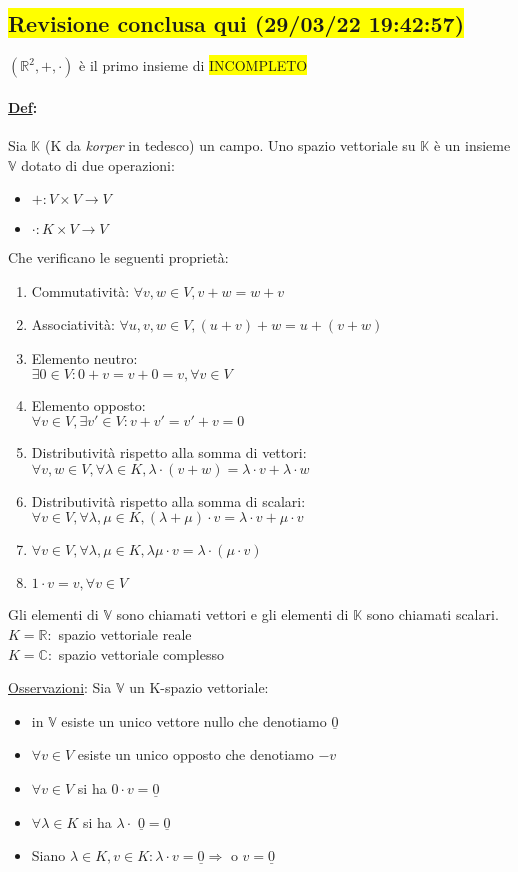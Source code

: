 \documentclass{article}
\newcommand{\hl}[1]{\colorbox{yellow}{#1}}
\newcommand{\ul}[1]{\underline{#1}}
\newcommand{\R}{\mathbb{R}}
\newcommand{\Def}[2]{\paragraph{\ul{Def}:}#1\\\hspace*{3em}\begin{minipage}{.8\textwidth}#2\end{minipage}}
\begin{document}
\subsection{\hl{Revisione conclusa qui (29/03/22 19:42:57)}}
$(\R^2,+,\cdot)$ è il primo insieme di \hl{INCOMPLETO}
\Def{Sia $\mathbb{K}$ (K da \textit{korper} in tedesco) un campo. Uno spazio vettoriale su $\mathbb{K}$ è un insieme $\mathbb{V}$ dotato di due operazioni:}{
	\begin{itemize}
		\item $+: V\times V\rightarrow V$
		\item $\cdot: K\times V\rightarrow V$
	\end{itemize}
	Che verificano le seguenti proprietà:
	\begin{enumerate}
		\item Commutatività: $\forall v,w\in V, v+w=w+v$
		\item Associatività: $\forall u,v,w\in V,(u+v)+w=u+(v+w)$
		\item Elemento neutro:\\$\exists0\in V:0+v=v+0=v,\forall v\in V$
		\item Elemento opposto:\\$\forall v\in V,\exists v'\in V:v+v'=v'+v=0$
		\item Distributività rispetto alla somma di vettori:\\$\forall v,w\in V,\forall\lambda\in K,\lambda\cdot(v+w)=\lambda\cdot v+\lambda\cdot w$
		\item Distributività rispetto alla somma di scalari:\\$\forall v\in V,\forall\lambda,\mu\in K,(\lambda+\mu)\cdot v=\lambda\cdot v+\mu\cdot v$
		\item $\forall v\in V,\forall\lambda,\mu\in K,\lambda\mu\cdot v=\lambda\cdot(\mu\cdot v)$
		\item $1\cdot v=v,\forall v\in V$
	\end{enumerate}
	Gli elementi di $\mathbb{V}$ sono chiamati vettori e gli elementi di $\mathbb{K}$ sono chiamati scalari.\\
	$K=\R:$ spazio vettoriale reale\\
	$K=\mathbb{C}:$ spazio vettoriale complesso

	\ul{Osservazioni}: Sia $\mathbb{V}$ un K-spazio vettoriale:
	\begin{itemize}
		\item in $\mathbb{V}$ esiste un unico vettore nullo che denotiamo $\ul{0}$
		\item $\forall v\in V$ esiste un unico opposto che denotiamo $-v$
		\item $\forall v\in V$ si ha $0\cdot v=\ul{0}$
		\item $\forall\lambda\in K$ si ha $\lambda\cdot$ $\ul{0}=\ul{0}$
		\item Siano $\lambda\in K,v\in K:\lambda\cdot v=\ul{0}\Rightarrow$ o $v=\ul{0}$
	\end{itemize}
}
\end{document}
